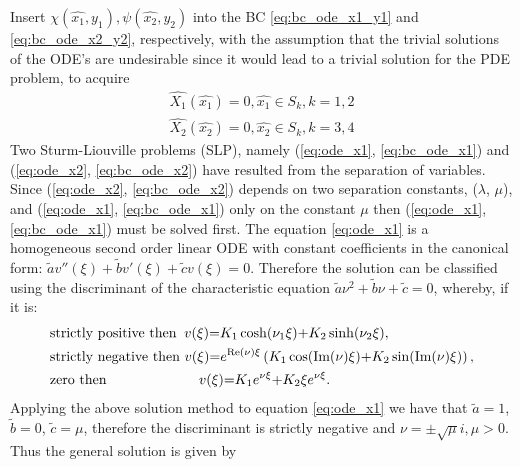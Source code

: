 \documentclass[\main/thesis.tex]{subfiles}
\begin{document}
Insert $\chi(\hat{x_1}, y_1), \psi(\hat{x_2}, y_2)$ into the BC \eqref{eq:bc_ode_x1_y1} and 
\eqref{eq:bc_ode_x2_y2}, respectively, with the assumption that the trivial solutions 
of the ODE's are undesirable since it would lead to a trivial solution for the PDE problem, to acquire
\begin{align}
    \hat{X_1}(\hat{x_1}) {=} 0, \hat{x_1} {\in} S_k, k {=} 1, 2 \label{eq:bc_ode_x1}\\
    \hat{X_2}(\hat{x_2}) {=} 0, \hat{x_2} {\in} S_k, k {=} 3, 4 \label{eq:bc_ode_x2}
\end{align}
Two Sturm-Liouville problems (SLP), namely (\ref{eq:ode_x1}, \ref{eq:bc_ode_x1}) 
and (\ref{eq:ode_x2}, \ref{eq:bc_ode_x2}) have resulted from the separation of 
variables. Since (\ref{eq:ode_x2}, \ref{eq:bc_ode_x2}) depends on two separation 
constants, ($\lambda$, $\mu$), and (\ref{eq:ode_x1}, \ref{eq:bc_ode_x1}) only 
on the constant $\mu$ then (\ref{eq:ode_x1}, \ref{eq:bc_ode_x1}) must be solved 
first. The equation \eqref{eq:ode_x1} is a homogeneous second order linear ODE 
with constant coefficients in the canonical form: 
$\tilde{a}v''(\xi) {+} \tilde{b}v'(\xi) {+} \tilde{c}v(\xi) {=} 0$.
Therefore the solution can be classified using the discriminant of the characteristic equation
$\tilde{a}\nu^2 {+} \tilde{b}\nu {+} \tilde{c} {=} 0$, whereby, if it is:
\begin{align*}
	&\text{strictly positive then } \hspace{0.03in} v(\xi) {=} K_1 \cosh(\nu_1 \xi) 
	                                                       {+} K_2 \sinh(\nu_2 \xi),
	 \\
	&\text{strictly negative then }                 v(\xi) {=} e^{\text{Re}(\nu) \xi}
	                                                           \left(
	                                                                 K_1 \cos(\text{Im}(\nu) \xi)
	                                                             {+} K_2 \sin(\text{Im}(\nu) \xi)
	                                                           \right),
	 \\
	&\text{zero then }              \hspace{0.87in} v(\xi) {=} K_1 e^{\nu \xi} 
	                                                       {+} K_2 \xi e^{\nu \xi}.
\end{align*}
Applying the above solution method to equation \eqref{eq:ode_x1} we have that $\tilde{a} {=} 1$, $\tilde{b} {=} 0$, $\tilde{c} {=} \mu$, therefore the discriminant is strictly negative and $\nu {=} {\pm}\sqrt{\mu}i, \mu {>} 0$. Thus the general solution is given by
\end{document}

